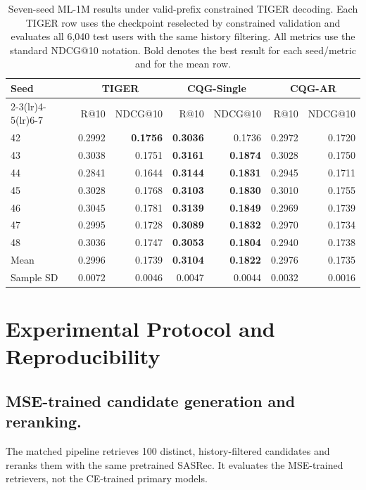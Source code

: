 \documentclass[letterpaper]{article}
\begin{document}
\begin{table}[H]
\centering
\small
\setlength{\tabcolsep}{5pt}
\begin{tabular}{lrrrrrr}
\toprule
Seed & \multicolumn{2}{c}{TIGER} & \multicolumn{2}{c}{CQG-Single} &
\multicolumn{2}{c}{CQG-AR} \\
\cmidrule(lr){2-3}\cmidrule(lr){4-5}\cmidrule(lr){6-7}
& R@10 & NDCG@10 & R@10 & NDCG@10 & R@10 & NDCG@10 \\
\midrule
42 & 0.2992 & \textbf{0.1756} & \textbf{0.3036} & 0.1736 & 0.2972 & 0.1720 \\
43 & 0.3038 & 0.1751 & \textbf{0.3161} & \textbf{0.1874} & 0.3028 & 0.1750 \\
44 & 0.2841 & 0.1644 & \textbf{0.3144} & \textbf{0.1831} & 0.2945 & 0.1711 \\
45 & 0.3028 & 0.1768 & \textbf{0.3103} & \textbf{0.1830} & 0.3010 & 0.1755 \\
46 & 0.3045 & 0.1781 & \textbf{0.3139} & \textbf{0.1849} & 0.2969 & 0.1739 \\
47 & 0.2995 & 0.1728 & \textbf{0.3089} & \textbf{0.1832} & 0.2970 & 0.1734 \\
48 & 0.3036 & 0.1747 & \textbf{0.3053} & \textbf{0.1804} & 0.2940 & 0.1738 \\
\midrule
Mean & 0.2996 & 0.1739 & \textbf{0.3104} & \textbf{0.1822} & 0.2976 & 0.1735 \\
Sample SD & 0.0072 & 0.0046 & 0.0047 & 0.0044 & 0.0032 & 0.0016 \\
\bottomrule
\end{tabular}
\caption{Seven-seed ML-1M results under valid-prefix constrained TIGER
decoding. Each TIGER row uses the checkpoint reselected by constrained
validation and evaluates all 6,040 test users with the same history filtering.
All metrics use the standard NDCG@10 notation. Bold denotes the best result
for each seed/metric and for the mean row.}
\label{tab:ml1m-seven-seed}
\end{table}


\section{Experimental Protocol and Reproducibility}
\label{app:protocol}


\subsection{MSE-trained candidate generation and reranking.}
\label{app:mse-rerank}
The matched pipeline retrieves 100 distinct, history-filtered candidates and
reranks them with the same pretrained SASRec. It evaluates the MSE-trained
retrievers, not the CE-trained primary models.
\end{document}
